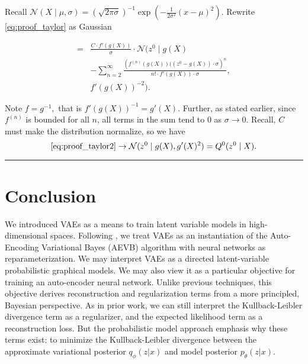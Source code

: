 \documentclass[11pt]{article}
\theoremstyle{plain}
\theoremstyle{definition}
\theoremstyle{plain}
\renewcommand{\qedsymbol}{\rule{0.6em}{0.6em}}
\begin{document}
Recall $\mathcal{N}(X\mid\mu,\sigma)=(\sqrt{2\pi\sigma})^{-1}\exp\left(-\frac{1}{2\sigma^{2}}(x-\mu)^{2}\right)$.
Rewrite \eqref{eq:proof_taylor} as Gaussian

\begin{equation}
\begin{aligned}= & \frac{C\cdot f'(g(X))}{\sigma}\cdot\mathcal{N}(z^{0}\mid g(X)\\
 & -\sum_{n=2}^{\infty}\frac{\left(f^{(n)}(g(X))((z^{0}-g(X))\cdot\sigma\right)^{n}}{n!\cdot f'(g(X))\cdot\sigma},\\
 & f'(g(X))^{-2}).
\end{aligned}
\label{eq:proof_taylor2}
\end{equation}

Note $f=g^{-1},$ that is $f'(g(X))^{-1}=g'(X)$. Further, as stated
earlier, since $f^{(n)}$ is bounded for all $n$, all terms in the
sum tend to 0 as $\sigma\rightarrow0$. Recall, $C$ must make the
distribution normalize, so we have
\begin{equation}
\eqref{eq:proof_taylor2}\rightarrow\mathcal{N}(z^{0}\mid g(X),g'(X)^{2})=Q^{0}(z^{0}\mid X).
\end{equation}

\begin{flushright}
\qedsymbol
\par\end{flushright}

\section{Conclusion}

We introduced VAEs as a means to train latent variable models in high-dimensional
spaces. Following \cite{journals/corr/KingmaW13}, we treat VAEs as
an instantiation of the Auto-Encoding Variational Bayes (AEVB) algorithm
with neural networks as reparameterization. We may interpret VAEs
as a directed latent-variable probabilistic graphical models. We may
also view it as a particular objective for training an auto-encoder
neural network. Unlike previous techniques, this objective derives
reconstruction and regularization terms from a more principled, Bayesian
perspective. As in prior work, we can still interpret the Kullback-Leibler
divergence term as a regularizer, and the expected likelihood term
as a reconstruction loss. But the probabilistic model approach emphasis
why these terms exist: to minimize the Kullback-Leibler divergence
between the approximate variational posterior $q_{\phi}(z\vert x)$
and model posterior $p_{\theta}(z\vert x)$.


 
\end{document}
